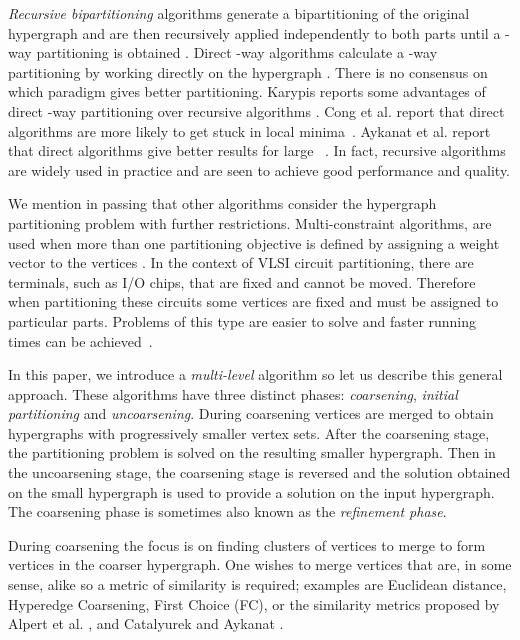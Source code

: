 \documentclass[twocolumn]{svjour3}          \smartqed
\begin{document}
\textit{Recursive bipartitioning} algorithms generate a bipartitioning of the original hypergraph and are then recursively applied independently to both parts until a -way partitioning is obtained \cite{fm1982,ccatalyurek2011patoh,devetal2006}. {Direct -way} algorithms calculate a -way partitioning by working directly on the hypergraph \cite{san1989kfm}. There is no consensus on which paradigm gives better partitioning. Karypis reports some advantages of direct {-way} partitioning over recursive algorithms \cite{karytech2002}. Cong et al.  report that direct algorithms are more likely to get stuck in local minima~\cite{cong1998}. Aykanat et al.  report that direct algorithms give better results for large ~\cite{aykanat2008fixed}. In fact, recursive algorithms are widely used in practice and are seen to achieve good performance and quality. 

We mention in passing that other algorithms consider the hypergraph partitioning problem with further restrictions. Multi-constraint algorithms, are used when more than one partitioning objective is defined by assigning a weight vector to the vertices \cite{aykanat2008fixed}.   In the context of VLSI circuit partitioning, there are terminals, such as I/O chips, that are fixed and cannot be moved. Therefore when partitioning these circuits some vertices are fixed and must be assigned to particular parts. Problems of this type are easier to solve and faster running times can be achieved~\cite{alpert2000fixed,ccatalyurek2011patoh,aykanat2008fixed}. 

In this paper, we introduce a \textit{multi-level} algorithm so let us describe this general approach.  These algorithms have three distinct phases: \textit{coarsening}, \textit{initial partitioning} and \textit{uncoarsening}. During coarsening vertices are merged to obtain hypergraphs with progressively smaller vertex sets. After the coarsening stage, the partitioning problem is solved on the resulting smaller hypergraph. Then in the uncoarsening stage, the coarsening stage is reversed and the solution obtained on the small hypergraph is used to provide a solution on the input hypergraph. The coarsening phase is sometimes also known as the \textit{refinement phase}.

During coarsening the focus is on finding clusters of vertices to merge to form vertices in the coarser hypergraph.  One wishes to merge vertices that are, in some sense, alike so a metric of similarity is required; examples are Euclidean distance, Hyperedge Coarsening, First Choice (FC), or the similarity metrics proposed by Alpert et al. \cite{alpert1998multilevel}, and Catalyurek and Aykanat \cite{catayk1999}. 
\end{document}
